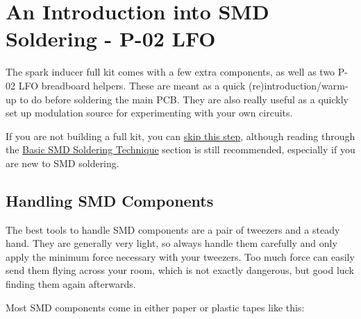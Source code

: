 \documentclass[12pt, a4paper]{article}
\begin{document}
\setcounter{section}{-1}

\pagebreak
\section{An Introduction into SMD Soldering \enspace - \enspace P-02 LFO}

The spark inducer full kit comes with a few extra components, as well as two P-02 LFO breadboard
helpers. These are meant as a quick (re)introduction/warm-up to do before soldering the main
PCB. They are also really useful as a quickly set up modulation source for experimenting with
your own circuits.

If you are not building a full kit, you can \hyperref[sec:smd_components]{skip this step},
although reading through the \hyperref[sec:basic_smd_soldering_techniques]{Basic SMD Soldering Technique}
section is still recommended, especially if you are new to SMD soldering.

\subsection{Handling SMD Components}

The best tools to handle SMD components are a pair of tweezers and a steady hand. They are
generally very light, so always handle them carefully and only apply the minimum force necessary
with your tweezers. Too much force can easily send them flying across your room, which is not
exactly dangerous, but good luck finding them again afterwards.

Most SMD components come in either paper or plastic tapes like this:
\end{document}
